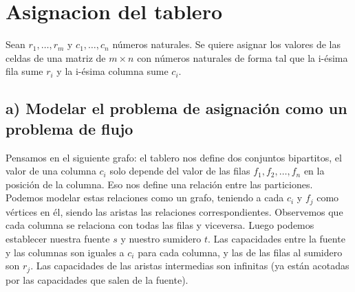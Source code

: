 \documentclass{article}
\begin{document}
\section*{Asignacion del tablero}

Sean \( r_1, \ldots, r_m \) y \( c_1, \ldots, c_n \) números naturales. Se quiere asignar los valores de las celdas de una matriz de \( m \times n \) con números naturales de forma tal que la i-ésima fila sume \( r_i \) y la i-ésima columna sume \( c_i \).

\subsection*{a) Modelar el problema de asignación como un problema de flujo}

Pensamos en el siguiente grafo: el tablero nos define dos conjuntos bipartitos, el valor de una columna \( c_i \) solo depende del valor de las filas \( f_1, f_2, \ldots, f_n \) en la posición de la columna. Eso nos define una relación entre las particiones. Podemos modelar estas relaciones como un grafo, teniendo a cada \( c_i \) y \( f_j \) como vértices en él, siendo las aristas las relaciones correspondientes. Observemos que cada columna se relaciona con todas las filas y viceversa. Luego podemos establecer nuestra fuente \( s \) y nuestro sumidero \( t \). Las capacidades entre la fuente y las columnas son iguales a \( c_i \) para cada columna, y las de las filas al sumidero son \( r_j \). Las capacidades de las aristas intermedias son infinitas (ya están acotadas por las capacidades que salen de la fuente).
\end{document}
